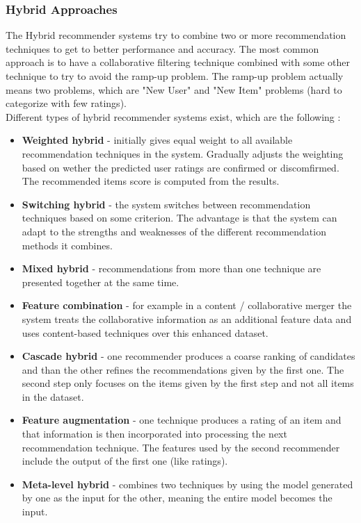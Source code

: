 \documentclass[\myFontSize,oneside,english,hidelinks,a4paper]{article}
\begin{document}
\subsubsection{Hybrid Approaches}
The Hybrid recommender systems try to combine two or more recommendation techniques to get to better performance and accuracy. The most common approach is to have a collaborative filtering technique combined with some other technique to try to avoid the ramp-up problem.
The ramp-up problem actually means two problems, which are "New User" and "New Item" problems (hard to categorize with few ratings).\\
Different types of hybrid recommender systems exist, which are the following \cite{Burke2002331}:
\begin{itemize}[label=--]
\item \textbf{Weighted hybrid} - initially gives equal weight to all available recommendation techniques in the system. Gradually adjusts the weighting based on wether the predicted user ratings are confirmed or discomfirmed. The recommended items score is computed from the results.
\item \textbf{Switching hybrid} - the system switches between recommendation techniques based on some criterion. The advantage is that the system can adapt to the strengths and weaknesses of the different recommendation methods it combines.
\item \textbf{Mixed hybrid} - recommendations from more than one technique are presented together at the same time. 
\item \textbf{Feature combination} - for example in a content / collaborative merger the system treats the collaborative information as an additional feature data and uses content-based techniques over this enhanced dataset.
\item \textbf{Cascade hybrid} - one recommender produces a coarse ranking of candidates and than the other refines the recommendations given by the first one. The second step only focuses on the items given by the first step and not all items in the dataset.
\item \textbf{Feature augmentation} - one technique produces a rating of an item and that information is then incorporated into processing the next recommendation technique. The features used by the second recommender include the output of the first one (like ratings).
\item \textbf{Meta-level hybrid} - combines two techniques by using the model generated by one as the input for the other, meaning the entire model becomes the input.\\
\end{itemize}
%
%
%
%
\end{document}
